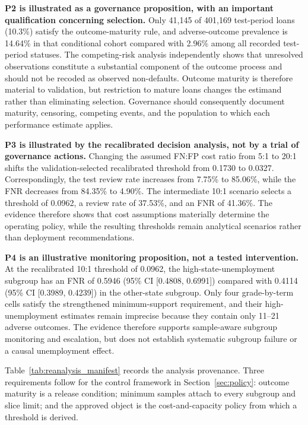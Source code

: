 \documentclass[10pt]{article}
\begin{document}
\textbf{P2 is illustrated as a governance proposition, with an important qualification concerning selection.} Only 41,145 of 401,169 test-period loans (10.3\%) satisfy the outcome-maturity rule, and adverse-outcome prevalence is 14.64\% in that conditional cohort compared with 2.96\% among all recorded test-period statuses. The competing-risk analysis independently shows that unresolved observations constitute a substantial component of the outcome process and should not be recoded as observed non-defaults. Outcome maturity is therefore material to validation, but restriction to mature loans changes the estimand rather than eliminating selection. Governance should consequently document maturity, censoring, competing events, and the population to which each performance estimate applies.

\textbf{P3 is illustrated by the recalibrated decision analysis, not by a trial of governance actions.} Changing the assumed FN:FP cost ratio from 5:1 to 20:1 shifts the validation-selected recalibrated threshold from 0.1730 to 0.0327. Correspondingly, the test review rate increases from 7.75\% to 85.06\%, while the FNR decreases from 84.35\% to 4.90\%. The intermediate 10:1 scenario selects a threshold of 0.0962, a review rate of 37.53\%, and an FNR of 41.36\%. The evidence therefore shows that cost assumptions materially determine the operating policy, while the resulting thresholds remain analytical scenarios rather than deployment recommendations.

\textbf{P4 is an illustrative monitoring proposition, not a tested intervention.} At the recalibrated 10:1 threshold of 0.0962, the high-state-unemployment subgroup has an FNR of 0.5946 (95\% CI [0.4808, 0.6991]) compared with 0.4114 (95\% CI [0.3989, 0.4239]) in the other-state subgroup. Only four grade-by-term cells satisfy the strengthened minimum-support requirement, and their high-unemployment estimates remain imprecise because they contain only 11--21 adverse outcomes. The evidence therefore supports sample-aware subgroup monitoring and escalation, but does not establish systematic subgroup failure or a causal unemployment effect.

Table~\ref{tab:reanalysis_manifest} records the analysis provenance. Three requirements follow for the control framework in Section~\ref{sec:policy}: outcome maturity is a release condition; minimum samples attach to every subgroup and slice limit; and the approved object is the cost-and-capacity policy from which a threshold is derived.
\end{document}

